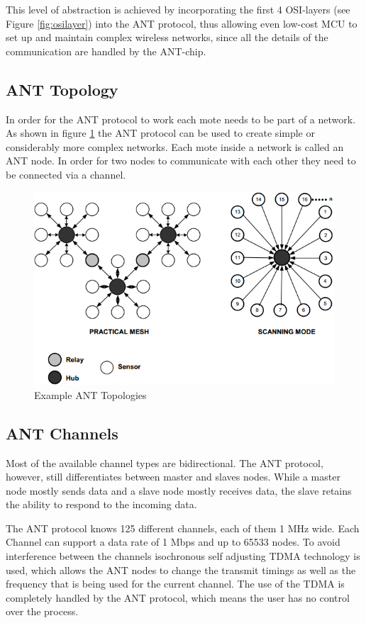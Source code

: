 This level of abstraction is achieved by incorporating the first 4 OSI-layers (see Figure \ref{fig:osilayer}) into the ANT protocol, thus allowing even low-cost MCU to set up and maintain complex wireless networks, since all the details of the communication are handled by the ANT-chip.

\subsection{ANT Topology}
In order for the ANT protocol to work each mote needs to be part of a network. As shown in figure \ref{fig:anttopo} the ANT protocol can be used to create simple or considerably more complex networks. Each mote inside a network is called an ANT node. In order for two nodes to communicate with each other they need to be connected via a channel.

\begin{figure}[h]
	\centering
	\includegraphics[scale=0.7]{./pics/ANTtopo.png}
	\caption{Example ANT Topologies\cite{DynastreamInnovationsInc.2013}}\label{fig:anttopo}
\end{figure}

\subsection{ANT Channels}
Most of the available channel types are bidirectional. The ANT protocol, however, still differentiates between master and slaves nodes. While a master node mostly sends data and a slave node mostly receives data, the slave retains the ability to respond to the incoming data.

The ANT protocol knows 125 different channels, each of them 1 MHz wide. Each Channel can support a data rate of 1 Mbps and up to 65533 nodes. To avoid interference between the channels isochronous self adjusting TDMA technology is used, which allows the ANT nodes to change the transmit timings as well as the frequency that is being used for the current channel. The use of the TDMA is completely handled by the ANT protocol, which means the user has no control over the process.

